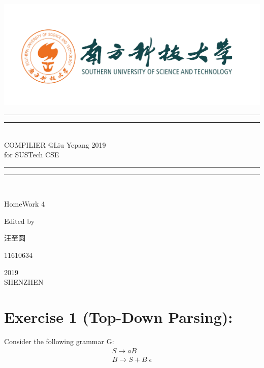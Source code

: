 \documentclass{article}
\begin{document}
 
    \begin{titlepage}       %
        \centering
        \includegraphics[width=\textwidth]{../SUSTC_LOGO.png}
        \rule{\textwidth}{1.6pt}\vspace*{-\baselineskip}\vspace*{2pt}
        \rule{\textwidth}{0.4pt}\\[\baselineskip]
        {\LARGE COMPILIER @Liu Yepang 2019\\[\baselineskip]\small for SUSTech CSE}
        \\[0.2\baselineskip]
        \rule{\textwidth}{0.4pt}\vspace*{-\baselineskip}\vspace{3.2pt}
        \rule{\textwidth}{1.6pt}\\[\baselineskip]
        \scshape
        \vspace*{\baselineskip}
        {\Large HomeWork 4\par }
        Edited by \\[\baselineskip] {汪至圆\par}
        {\Large 11610634\par }
        \vfill
        {\scshape 2019} \\{\large SHENZHEN}\par
    \end{titlepage}
    \section{Exercise 1 (Top-Down Parsing): }
    Consider the following grammar G:
    $$
        \begin{array}{c}{S \rightarrow a B} \\ {B \rightarrow S+B | \epsilon}\end{array}
    $$
\end{document}
